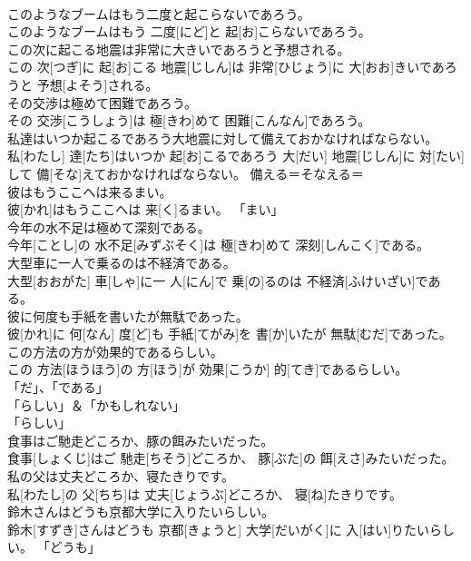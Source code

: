 \documentclass[8pt]{extreport}
\begin{document}
\begin{CJK}{UTF8}{min}
\\	このようなブームはもう二度と起こらないであろう。	
\\	このようなブームはもう 二度[にど]と 起[お]こらないであろう。	
\\	この次に起こる地震は非常に大きいであろうと予想される。	
\\	この 次[つぎ]に 起[お]こる 地震[じしん]は 非常[ひじょう]に 大[おお]きいであろうと 予想[よそう]される。	
\\	その交渉は極めて困難であろう。	
\\	その 交渉[こうしょう]は 極[きわ]めて 困難[こんなん]であろう。	
\\	私達はいつか起こるであろう大地震に対して備えておかなければならない。	
\\	私[わたし] 達[たち]はいつか 起[お]こるであろう 大[だい] 地震[じしん]に 対[たい]して 備[そな]えておかなければならない。	備える＝そなえる＝ 
\\	彼はもうここへは来るまい。	
\\	彼[かれ]はもうここへは 来[く]るまい。	「まい」
\\	今年の水不足は極めて深刻である。	
\\	今年[ことし]の 水不足[みずぶそく]は 極[きわ]めて 深刻[しんこく]である。	
\\	大型車に一人で乗るのは不経済である。	
\\	大型[おおがた] 車[しゃ]に一 人[にん]で 乗[の]るのは 不経済[ふけいざい]である。	
\\	彼に何度も手紙を書いたが無駄であった。	
\\	彼[かれ]に 何[なん] 度[ど]も 手紙[てがみ]を 書[か]いたが 無駄[むだ]であった。	
\\	この方法の方が効果的であるらしい。	
\\	この 方法[ほうほう]の 方[ほう]が 効果[こうか] 的[てき]であるらしい。	
\\	「だ」、「である」
\\	「らしい」＆「かもしれない」 
\\	「らしい」
\\	食事はご馳走どころか、豚の餌みたいだった。	
\\	食事[しょくじ]はご 馳走[ちそう]どころか、 豚[ぶた]の 餌[えさ]みたいだった。	
\\	私の父は丈夫どころか、寝たきりです。	
\\	私[わたし]の 父[ちち]は 丈夫[じょうぶ]どころか、 寝[ね]たきりです。	
\\	鈴木さんはどうも京都大学に入りたいらしい。	
\\	鈴木[すずき]さんはどうも 京都[きょうと] 大学[だいがく]に 入[はい]りたいらしい。	「どうも」

\end{CJK}
\end{document}
